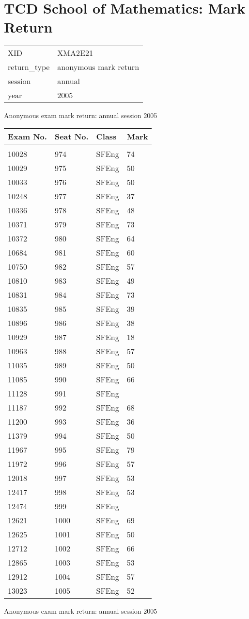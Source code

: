 \documentclass[a4paper]{article}
\begin{document}
\section*{TCD School of Mathematics: Mark Return}
\begin{tabular}{ll}
XID&XMA2E21\\
return_type&anonymous mark return\\
session&annual\\
year&2005\\
\end{tabular}
\begin{center}
Anonymous exam mark return: annual session 2005
\end{center}

\begin{tabular}{llll}
Exam No.&Seat No.&Class&Mark\\[3pt]
 \hline\\[3pt]
10028&974&SFEng&74\\
10029&975&SFEng&50\\
10033&976&SFEng&50\\
10248&977&SFEng&37\\
10336&978&SFEng&48\\
10371&979&SFEng&73\\
10372&980&SFEng&64\\
10684&981&SFEng&60\\
10750&982&SFEng&57\\
10810&983&SFEng&49\\
10831&984&SFEng&73\\
10835&985&SFEng&39\\
10896&986&SFEng&38\\
10929&987&SFEng&18\\
10963&988&SFEng&57\\
11035&989&SFEng&50\\
11085&990&SFEng&66\\
11128&991&SFEng&\\
11187&992&SFEng&68\\
11200&993&SFEng&36\\
11379&994&SFEng&50\\
11967&995&SFEng&79\\
11972&996&SFEng&57\\
12018&997&SFEng&53\\
12417&998&SFEng&53\\
12474&999&SFEng&\\
12621&1000&SFEng&69\\
12625&1001&SFEng&50\\
12712&1002&SFEng&66\\
12865&1003&SFEng&53\\
12912&1004&SFEng&57\\
13023&1005&SFEng&52\\
\end{tabular}
\newpage
\begin{center}
Anonymous exam mark return: annual session 2005
\end{center}
\end{document}
